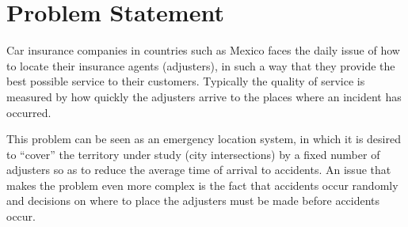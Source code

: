 \section{Problem Statement}
Car insurance companies
in countries such as Mexico
faces the daily issue
of how to locate
their insurance agents (adjusters),
in such a way
that they provide
the best possible service
to their customers.
Typically
the quality of service
is measured
by how quickly
the adjusters arrive
to the places
where an incident has occurred.

This problem
can be seen
as an emergency location system, %
in which
it is desired to ``cover''
the territory under study
(city intersections)
by a fixed number of adjusters
so as to reduce
the average time
of arrival to accidents.
An issue
that makes the problem
even more complex
is the fact
that accidents occur randomly
and decisions
on where to place the adjusters
must be made before
accidents occur.
